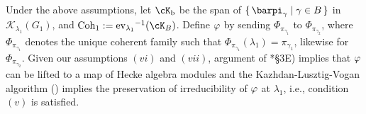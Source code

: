 \documentclass[12pt,a4paper]{amsart}
\newcommand{\trivial}[2][]{\if\relax\detokenize{#1}\relax
  {%
      \color{orange} \vspace{0em} $[$  #2 $]$
      \color{black}
  }
  \else
\ifx#1h
\ifcsname showtrivial\endcsname
{%
    \color{orange} \vspace{0em}  $[$ #2 $]$
    \color{black}
}
\fi
\else {\red Wrong argument!} \fi
\fi
}
\newcommand{\CK}{{\mathcal {K}}}
\numberwithin{equation}{section}
\newtheorem{lem}[thm]{Lemma}
\theoremstyle{remark}
\def\Coh{\mathrm{Coh}}
\def\ev#1{{\mathrm{ev}_{#1}}}
\newcommand{\Grt}{\cK}
\begin{document}
Under the above assumptions, let $\Grt_{\mathrm b}$ be the span of
$\set{\barpi_{\gamma}|\gamma\in B}$ in $\CK_{\lambda_1}(G_1)$, and $\Coh_{1} := \ev{\lambda_1}^{-1}(\Grt_{B})$.
Define $\varphi$ by sending $\Phi_{\pi_{\gamma_{1}}}$ to
$\Phi_{\pi_{\gamma_{2}}}$, where $\Phi_{\pi_{\gamma_{1}}}$ denotes the unique coherent family such that $\Phi_{\pi_{\gamma_{1}}}(\lambda _1)=\pi_{\gamma_{1}}$, likewise for $\Phi_{\pi_{\gamma_{2}}}$. 
Given our assumptions $(vi)$ and $(vii)$, argument of \cite{GI}*{\S 3E}) implies that %
$\varphi$ can be lifted to a map of Hecke algebra modules and the Kazhdan-Lusztig-Vogan algorithm (\cite{V3,RT1}) implies the preservation of irreducibility of
$\varphi$ at $\lambda_{1}$, i.e., condition $(v)$ is satisfied.



\end{document}
